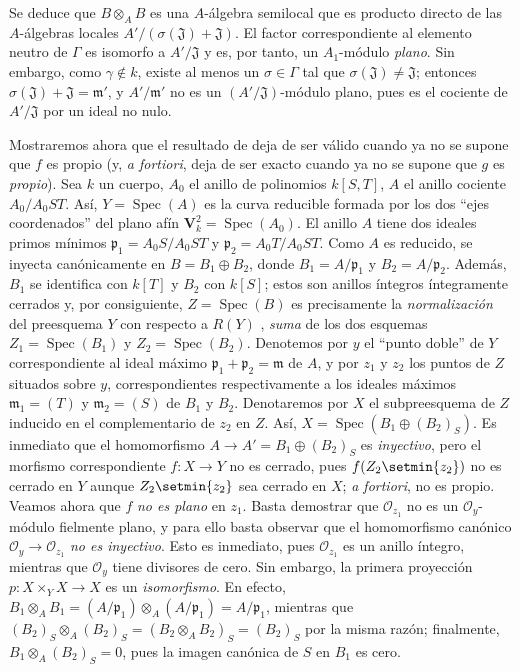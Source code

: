 \begin{env}[11.7.1]
Se deduce que $B\otimes_A B$ es una $A$-álgebra semilocal que es producto directo de las $A$-álgebras locales $A'/(\sigma(\mathfrak J)+\mathfrak J)$. El factor correspondiente al elemento neutro de $\Gamma$ es isomorfo a $A'/\mathfrak J$ y es, por tanto, un $A_1$-módulo \emph{plano}. Sin embargo, como $\gamma\notin k$, existe al menos un $\sigma\in\Gamma$ tal que $\sigma(\mathfrak J)\ne\mathfrak J$; entonces $\sigma(\mathfrak J)+\mathfrak J=\mathfrak m'$, y $A'/\mathfrak m'$ no es un $(A'/\mathfrak J)$-módulo plano, pues es el cociente de $A'/\mathfrak J$ por un ideal no nulo.
\end{env}

\begin{env}[11.7.2]
\label{IV.11.7.2}
Mostraremos ahora que el resultado de  deja de ser válido cuando ya no se supone que $f$ es propio (y, \emph{a fortiori},  deja de ser exacto cuando ya no se supone que $g$ es \emph{propio}).
Sea $k$ un cuerpo, $A_0$ el anillo de polinomios $k[S,T]$, $A$ el anillo cociente $A_0/A_0ST$. Así, $Y=\operatorname{Spec}(A)$ es la curva reducible formada por los dos ``ejes coordenados'' del plano afín $\mathbf V_k^2=\operatorname{Spec}(A_0)$.
El anillo $A$ tiene dos ideales primos mínimos $\mathfrak p_1=A_0S/A_0ST$ y $\mathfrak p_2=A_0T/A_0ST$. Como $A$ es reducido, se inyecta canónicamente en $B=B_1\oplus B_2$, donde $B_1=A/\mathfrak p_1$ y $B_2=A/\mathfrak p_2$. Además, $B_1$ se identifica con $k[T]$ y $B_2$ con $k[S]$; estos son anillos íntegros íntegramente cerrados y, por consiguiente, $Z=\operatorname{Spec}(B)$ es precisamente la \emph{normalización} del preesquema $Y$ con respecto a $R(Y)$ , \emph{suma} de los dos esquemas $Z_1=\operatorname{Spec}(B_1)$ y $Z_2=\operatorname{Spec}(B_2)$.
Denotemos por $y$ el ``punto doble'' de $Y$ correspondiente al ideal máximo $\mathfrak p_1+\mathfrak p_2=\mathfrak m$ de $A$, y por $z_1$ y $z_2$ los puntos de $Z$ situados sobre $y$, correspondientes respectivamente a los ideales máximos $\mathfrak m_1=(T)$ y $\mathfrak m_2=(S)$ de $B_1$ y $B_2$.
Denotaremos por $X$ el subpreesquema de $Z$ inducido en el complementario de $z_2$ en $Z$. Así, $X=\operatorname{Spec}(B_1\oplus(B_2)_S)$. Es inmediato que el homomorfismo $A\to A'=B_1\oplus(B_2)_S$ es \emph{inyectivo}, pero el morfismo correspondiente $f:X\to Y$ no es cerrado, pues $f(Z_2\setmin\{z_2\})$ no es cerrado en $Y$ aunque $Z_2\setmin\{z_2\}$ sea cerrado en $X$; \emph{a fortiori}, no es propio.
Veamos ahora que $f$ \emph{no es plano} en $z_1$. Basta demostrar  que $\mathcal O_{z_1}$ no es un $\mathcal O_y$-módulo fielmente plano, y para ello basta observar que el homomorfismo canónico $\mathcal O_y\to\mathcal O_{z_1}$ \emph{no es inyectivo}. Esto es inmediato, pues $\mathcal O_{z_1}$ es un anillo íntegro, mientras que $\mathcal O_y$ tiene divisores de cero.
Sin embargo, la primera proyección $p:X\times_Y X\to X$ es un \emph{isomorfismo}. En efecto,
$B_1\otimes_A B_1=(A/\mathfrak p_1)\otimes_A(A/\mathfrak p_1)=A/\mathfrak p_1$,
mientras que $(B_2)_S\otimes_A(B_2)_S=(B_2\otimes_A B_2)_S=(B_2)_S$ por la misma razón; finalmente, $B_1\otimes_A(B_2)_S=0$, pues la imagen canónica de $S$ en $B_1$ es cero.
\end{env}

